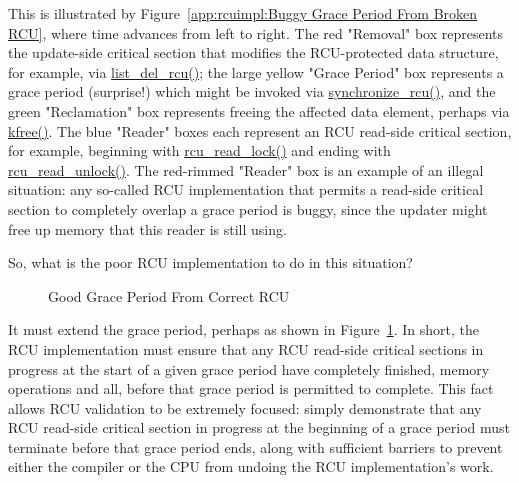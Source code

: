 This is illustrated by
Figure~\ref{app:rcuimpl:Buggy Grace Period From Broken RCU},
where time advances from left to right.
The red "Removal" box represents the update-side critical section that
modifies the RCU-protected data structure, for example, via
\url{list_del_rcu()}; the large yellow "Grace Period" box
represents a grace period (surprise!) which might be invoked via
\url{synchronize_rcu()}, and the green "Reclamation" box
represents freeing the affected data element,
perhaps via \url{kfree()}.
The blue "Reader" boxes each represent an RCU read-side critical section,
for example, beginning with \url{rcu_read_lock()} and ending with
\url{rcu_read_unlock()}.
The red-rimmed "Reader" box is an example of an illegal situation:
any so-called RCU implementation that permits a read-side critical section
to completely overlap a grace period is buggy, since the updater might
free up memory that this reader is still using.

So, what is the poor RCU implementation to do in this situation?

\begin{figure}[htb]
\begin{center}
\end{center}
\caption{Good Grace Period From Correct RCU}
\label{app:rcuimpl:Good Grace Period From Correct RCU}
\end{figure}

It must extend the grace period, perhaps as shown in
Figure~\ref{app:rcuimpl:Good Grace Period From Correct RCU}.
In short, the RCU implementation must ensure that any
RCU read-side critical sections in progress at the start of a given grace
period have completely finished, memory operations and all, before that
grace period is permitted to complete.
This fact allows RCU validation to be extremely focused: simply demonstrate
that any RCU read-side critical section in progress at the beginning of
a grace period must terminate before that grace period ends, along with
sufficient barriers to prevent either the compiler or the CPU from undoing
the RCU implementation's work.

